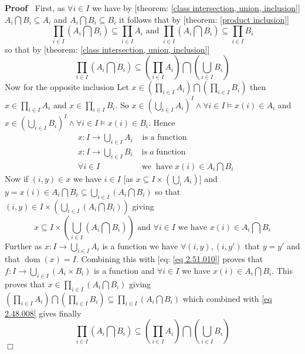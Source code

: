 \documentclass{book}
\newcommand{\tmop}[1]{\ensuremath{\operatorname{#1}}}
\newenvironment{proof}{\noindent\textbf{Proof\ }}{\hspace*{\fill}$\Box$\medskip}
\begin{document}
\begin{proof}
  First, as $\forall i \in I$ we have by [theorem: \ref{class intersection,
  union, inclusion}] $A_i \bigcap B_i \subseteq A_i$ and $A_i \bigcap B_i
  \subseteq B_i$ it follows that by [theorem: \ref{product inclusion}]
  \[ \prod_{i \in I} \left( A_i \bigcap B_i \right) \subseteq \prod_{i \in I}
     A_i \text{ and } \prod_{i \in I} \left( A_i \bigcap B_i \right) \subseteq
     \prod_{i \in I} B_i \]
  so that by [theorem: \ref{class intersection, union, inclusion}]
  \begin{equation}
    \label{eq 2.48.008} \prod_{i \in I} \left( A_i \bigcap B_i \right)
    \subseteq \left( \prod_{i \in I} A_i \right) \bigcap \left( \bigcup_{i \in
    I} B_i \right)
  \end{equation}
  Now for the opposite inclusion Let $x \in \left( \prod_{i \in I} A_i \right)
  \bigcap \left( \prod_{i \in I} B_i \right)$ then $x \in \prod_{i \in I} A_i$
  and $x \in \prod_{i \in I} B_i$. So $x \in \left( \bigcup_{i \in I} A_i
  \right)^I \wedge \forall i \in I \vDash x (i) \in A_i$ and $x \in \left(
  \bigcup_{i \in I} B_i \right)^I \wedge \forall i \in I \vDash x (i) \in
  B_i$. Hence
  \begin{eqnarray*}
    & x : I \rightarrow \bigcup_{i \in I} A_i & \text{ is a function}\\
    & x : I \rightarrow \bigcup_{i \in I} B_i & \tmop{is} a \tmop{function}\\
    & \forall i \in I & \tmop{we} \tmop{have} x (i) \in A_i \bigcap B_i
  \end{eqnarray*}
  Now if $(i, y) \in x$ we have $i \in I$ [as $x \subseteq I \times \left(
  \bigcup_i A_i \right)$] and $y = x (i) \in A_i \bigcap B_i \subseteq
  \bigcup_{i \in I} \left( A_i \bigcap B_i \right)$ so that $(i, y) \in I
  \times \left( \bigcup_{i \in I} \left( A_i \bigcap B_i \right) \right)$
  giving
  \begin{equation}
    \label{eq 2.51.010} x \subseteq I \times \left( \bigcup_{i \in I} \left(
    A_i \bigcap B_i \right) \right) \text{ and } \forall i \in I \text{ we
    have $x (i) \in A_i \bigcap B_i$}
  \end{equation}
  Further as $x : I \rightarrow \bigcup_{i \in I} A_i$ is a function we have
  $\forall (i, y), (i, y')$ that $y = y'$ and that $\tmop{dom} (x) = I$.
  Combining this with [eq: \ref{eq 2.51.010}] proves that $f : I \rightarrow
  \bigcup_{i \in I} (A_i \times B_i)$ is a function and $\forall i \in I$ we
  have $x (i) \in A_i \bigcap B_i$. This proves that $x \in \prod_{i \in I}
  \left( A_i \bigcap B_i \right)$ giving $\left( \prod_{i \in I} A_i \right)
  \bigcap \left( \prod_{i \in I} B_i \right) \subseteq \prod_{i \in I} \left(
  A_i \bigcap B_i \right)$ which combined with \ref{eq 2.48.008} gives finally
  \[ \prod_{i \in I} \left( A_i \bigcap B_i \right) \subseteq \left( \prod_{i
     \in I} A_i \right) \bigcap \left( \bigcup_{i \in I} B_i \right) \]
\end{proof}
\end{document}
